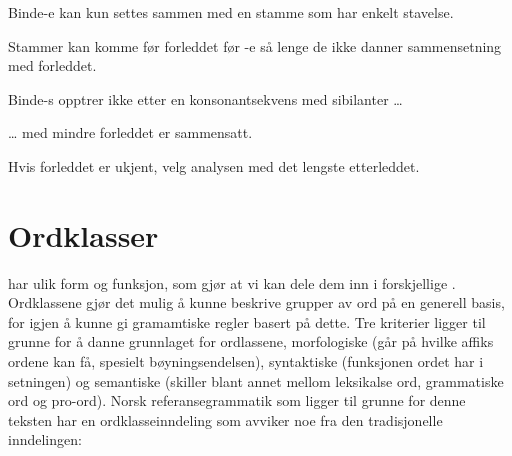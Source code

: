 \begin{enum}
		\newline
	
	\item Binde-e kan kun settes sammen med en stamme som har enkelt stavelse.
		
		\newline
		\newline
	
	\item Stammer kan komme før forleddet før -e så lenge de ikke danner sammensetning med forleddet.
		
		\newline
	
	\item Binde-s opptrer ikke etter en konsonantsekvens med sibilanter … 
		
		\newline
	
	\item … med mindre forleddet er sammensatt.
		
		\newline
	
	\item Hvis forleddet er ukjent, velg analysen med det lengste etterleddet.
		
		\newline
	
\end{enum}

\section{Ordklasser}
\label{sec:ordklasser}

 har ulik form og funksjon, som gjør at vi kan dele dem inn i forskjellige . Ordklassene gjør det mulig å kunne beskrive grupper av ord på en generell basis, for igjen å kunne gi gramamtiske regler basert på dette. Tre kriterier ligger til grunne for å danne grunnlaget for ordlassene, morfologiske (går på hvilke affiks ordene kan få, spesielt bøyningsendelsen), syntaktiske (funksjonen ordet har i setningen) og semantiske (skiller blant annet mellom leksikalse ord, grammatiske ord og pro-ord). Norsk referansegrammatik som ligger til grunne for denne teksten har en ordklasseinndeling som avviker noe fra den tradisjonelle inndelingen\cite{faarlund1997norsk}:


